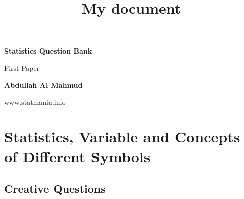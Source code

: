 \documentclass[a4paper,oneside]{book}
\title{My document}
\begin{document}
\frontmatter

\begin{titlepage}
    \begin{center}
        \vspace*{1cm}
            
        \Huge
        \textbf{Statistics Question Bank}
            
        \vspace{0.5cm}
        \LARGE
        First Paper
            
        \vspace{1.5cm}
            
        \textbf{Abdullah Al Mahmud}
            
        \vfill
            
            
        \vspace{0.8cm}
            
            
        \Large
        www.statmania.info\\
            
    \end{center}
\end{titlepage}

\tableofcontents


\mainmatter

\chapter{Statistics, Variable and Concepts of Different Symbols} 


\section{Creative Questions}
\end{document}
